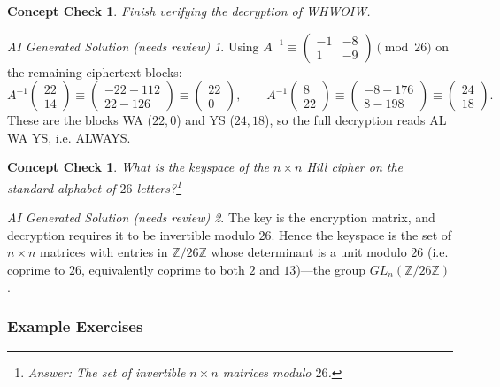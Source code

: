 \documentclass{article}
\theoremstyle{plain}
\newtheorem{checkin}[theorem]{Concept Check}
\theoremstyle{definition}
\theoremstyle{remark}
\newtheorem*{aisolution}{AI Generated Solution (needs review)}
\numberwithin{theorem}{section}
\newcommand{\ZZ}{\mathbb{Z}}
\begin{document}
\begin{checkin}
    Finish verifying the decryption of WHWOIW.
\end{checkin}
\begin{aisolution}
Using $A^{-1} \equiv \left(\begin{smallmatrix} -1 & -8 \\ 1 & -9\end{smallmatrix}\right) \pmod{26}$ on the remaining ciphertext blocks:
\[
A^{-1}\begin{pmatrix} 22 \\ 14 \end{pmatrix} \equiv \begin{pmatrix} -22-112 \\ 22-126 \end{pmatrix} \equiv \begin{pmatrix} 22 \\ 0 \end{pmatrix}, \qquad
A^{-1}\begin{pmatrix} 8 \\ 22 \end{pmatrix} \equiv \begin{pmatrix} -8-176 \\ 8-198 \end{pmatrix} \equiv \begin{pmatrix} 24 \\ 18 \end{pmatrix}.
\]
These are the blocks WA ($22,0$) and YS ($24,18$), so the full decryption reads AL WA YS, i.e. ALWAYS.
\end{aisolution}

\begin{checkin}
    What is the keyspace of the $n \times n$ Hill cipher on the standard alphabet of $26$ letters?\footnote{Answer:  The set of invertible $n \times n$ matrices modulo $26$.}
\end{checkin}
\begin{aisolution}
The key is the encryption matrix, and decryption requires it to be invertible modulo $26$.  Hence the keyspace is the set of $n\times n$ matrices with entries in $\ZZ/26\ZZ$ whose determinant is a unit modulo $26$ (i.e. coprime to $26$, equivalently coprime to both $2$ and $13$)---the group $GL_n(\ZZ/26\ZZ)$.
\end{aisolution}

\subsubsection{Example Exercises}
\end{document}
